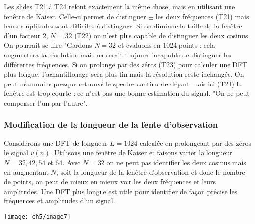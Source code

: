 			Les slides T21 à T24 refont exactement la même chose, mais en utilisant une fenêtre de Kaiser. 
			Celle-ci permet de distinguer $\pm$ les deux fréquences (T21) mais leurs amplitudes sont 
			difficiles à distinguer. Si on diminue la taille de la fenêtre d'un facteur 2, $N=32$ (T22) on 
			n'est plus capable de distinguer les deux cosinus. On pourrait se dire "Gardons $N=32$ et 
			évaluons en 1024 points : cela augmentera la résolution mais on serait toujours incapable de 
			distinguer les différentes fréquences. Si on prolonge par des zéros (T23) pour calculer une 
			DFT plus longue, l'achantillonage sera plus fin mais la résolution reste inchangée.  On peut 
			néanmoins presque retrouvé le spectre continu de départ mais ici (T24) la fenêtre est trop 
			courte : ce n'est pas une bonne estimation du signal. "On ne peut compenser l'un par l'autre".
			
			
			\subsubsection{Modification de la longueur de la fente d'observation}
			Considérons une DFT de longueur $L=1024$ calculée en prolongeant par des zéros le signal 
			$v(n)$. Utilisons une fenêtre de Kaiser et faisons varier la longueur $N=32,42,54$ et 64.
			Avec $N=32$ on ne peut pas identifier les deux cosinus mais en augmentant $N$, soit la 
			longueur de la fenêtre d’observation et donc le nombre de points, on peut de mieux en mieux 
			voir les deux fréquences et leurs amplitudes. Une DFT plus longue est utile pour identifier 
			de façon précise les fréquences et amplitudes d'un signal.
	
				\begin{center}
	\texttt{[image: ch5/image7]}
	\end{center}
	
	
	
	
	
	
	
	
	
	
	
	
	
	
	
	
	
	
	
	
	
	
	
	
